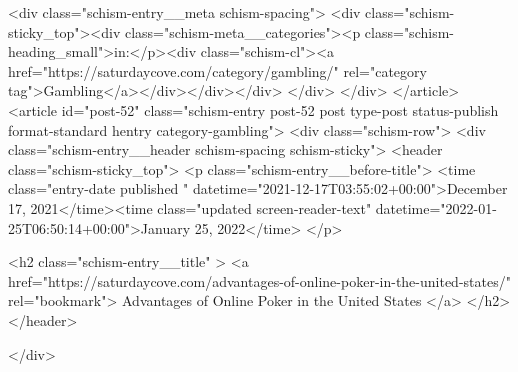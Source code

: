 {		<div class="schism-entry__meta schism-spacing">			<div class="schism-sticky_top"><div class="schism-meta__categories"><p class="schism-heading_small">in:</p><div class="schism-cl"><a href="https://saturdaycove.com/category/gambling/" rel="category tag">Gambling</a></div></div></div>		</div>
	</div>
</article>
<article id="post-52" class="schism-entry post-52 post type-post status-publish format-standard hentry category-gambling">
	<div class="schism-row">		<div class="schism-entry__header schism-spacing schism-sticky">			<header class="schism-sticky_top">				<p class="schism-entry__before-title">
					<time class="entry-date published " datetime="2021-12-17T03:55:02+00:00">December 17, 2021</time><time class="updated screen-reader-text" datetime="2022-01-25T06:50:14+00:00">January 25, 2022</time>				</p>

				<h2 class="schism-entry__title" >
					<a href="https://saturdaycove.com/advantages-of-online-poker-in-the-united-states/" rel="bookmark">
						Advantages of Online Poker in the United States					</a>
				</h2>
			</header>

					</div>

}
